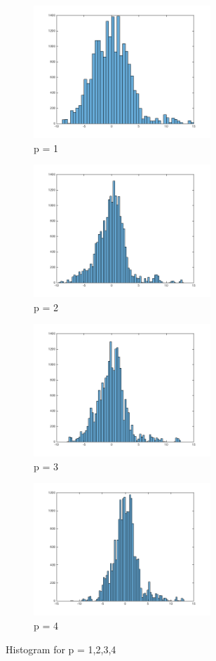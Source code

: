 \documentclass{article}
\begin{document}
\begin{figure}[h]
\begin{subfigure}{0.5\textwidth}
\includegraphics[width=0.9\linewidth, height=5cm]{hist1} 
\caption{p = 1}
\label{fig:subim1}
\end{subfigure}
\begin{subfigure}{0.5\textwidth}
\includegraphics[width=0.9\linewidth, height=5cm]{hist2}
\caption{p = 2}
\label{fig:subim2}
\end{subfigure}
 \begin{subfigure}{0.5\textwidth}
\includegraphics[width=0.9\linewidth, height=5cm]{hist3}
\caption{p = 3}
\label{fig:subim3}
\end{subfigure}
\begin{subfigure}{0.5\textwidth}
\includegraphics[width=0.9\linewidth, height=5cm]{hist4}
\caption{p = 4}
\label{fig:subim4}
\end{subfigure}
\caption{Histogram for p = 1,2,3,4}
\label{fig:image2}
\end{figure}
\end{document}
